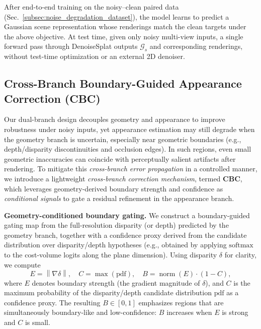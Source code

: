 After end-to-end training on the noisy--clean paired data (Sec.~\ref{subsec:noise_degradation_dataset}), the model learns to predict a Gaussian scene representation whose renderings match the clean targets under the above objective.
At test time, given only noisy multi-view inputs, a single forward pass through DenoiseSplat outputs \(\mathcal{G}_{s}\) and corresponding renderings, without test-time optimization or an external 2D denoiser.



\subsection{Cross-Branch Boundary-Guided Appearance Correction (CBC)}
\label{subsec:cbc}

Our dual-branch design decouples geometry and appearance to improve robustness under noisy inputs, yet appearance estimation may still degrade when the geometry branch is uncertain, especially near geometric boundaries (e.g., depth/disparity discontinuities and occlusion edges).
In such regions, even small geometric inaccuracies can coincide with perceptually salient artifacts after rendering.
To mitigate this \emph{cross-branch error propagation} in a controlled manner, we introduce a lightweight \emph{cross-branch correction mechanism}, termed \textbf{CBC}, which leverages geometry-derived boundary strength and confidence as \emph{conditional signals} to gate a residual refinement in the appearance branch.

\noindent\textbf{Geometry-conditioned boundary gating.}
We construct a boundary-guided gating map from the full-resolution disparity (or depth) predicted by the geometry branch, together with a confidence proxy derived from the candidate distribution over disparity/depth hypotheses (e.g., obtained by applying \(\mathrm{softmax}\) to the cost-volume logits along the plane dimension).
Using disparity $\delta$ for clarity, we compute
\begin{equation}
E = \left\lVert \nabla \delta \right\rVert,\quad
C = \max(\mathrm{pdf}),\quad
B = \operatorname{norm}(E)\cdot(1-C),
\label{eq:cbc_gate}
\end{equation}
where $E$ denotes boundary strength (the gradient magnitude of $\delta$), and $C$ is the maximum probability of the disparity/depth candidate distribution $\mathrm{pdf}$ as a confidence proxy.
The resulting $B\in[0,1]$ emphasizes regions that are simultaneously boundary-like and low-confidence: $B$ increases when $E$ is strong and $C$ is small.

